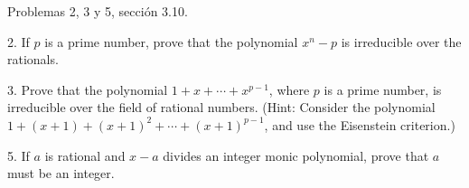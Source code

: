




Problemas 2, 3 y 5, sección 3.10.


\begin{problema}[Problema 2]
    2. If $p$ is a prime number, prove that the polynomial $x^n-p$ is irreducible over the rationals.

    \begin{dem}
    \end{dem}
\end{problema}

\begin{problema}[Problema 3]
    3. Prove that the polynomial $1+x+\cdots+x^{p-1}$, where $p$ is a prime number, is irreducible over the field of rational numbers. (Hint: Consider the polynomial $1+(x+1)+(x+1)^2+\cdots+(x+1)^{p-1}$, and use the Eisenstein criterion.)

    \begin{dem}
    \end{dem}
\end{problema}

\begin{problema}[Problema 5]

5. If $a$ is rational and $x-a$ divides an integer monic polynomial, prove that $a$ must be an integer.
    \begin{dem}
    \end{dem}
\end{problema}

%
%

